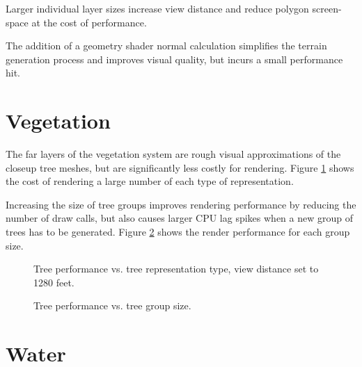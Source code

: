 Larger individual layer sizes increase view distance and reduce polygon screen-space at the cost of performance.

The addition of a geometry shader normal calculation simplifies the terrain generation process and improves visual quality, but incurs a small performance hit.


\section{Vegetation}

The far layers of the vegetation system are rough visual approximations of the closeup tree meshes, but are significantly less costly for rendering.
Figure \ref{fig:tree_plot_1} shows the cost of rendering a large number of each type of representation.

Increasing the size of tree groups improves rendering performance by reducing the number of draw calls, but also causes larger CPU lag spikes when a new group of trees has to be generated.
Figure \ref{fig:tree_plot_2} shows the render performance for each group size.

\begin{figure}
	\centering
{}
	\caption{
		Tree performance vs. tree representation type, view distance set to 1280 feet.
	}
	\label{fig:tree_plot_1}
\end{figure}

\begin{figure}
	\centering
{}
	\caption{
		Tree performance vs. tree group size.
	}
	\label{fig:tree_plot_2}
\end{figure}


\section{Water}
